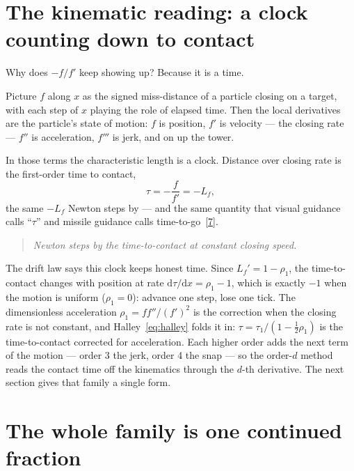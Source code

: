 \documentclass[11pt]{article}
\newcommand{\dd}{\mathrm{d}}
\newcommand{\Lf}{L_{f}}                 %
\newcommand{\rr}{\rho}                  %
\newcommand{\order}{d}                  %
\begin{document}
\section{The kinematic reading: a clock counting down to contact}

Why does $-f/f'$ keep showing up? Because it is a time.

Picture $f$ along $x$ as the signed miss-distance of a particle closing on a target,
with each step of $x$ playing the role of elapsed time. Then the local derivatives
are the particle's state of motion: $f$ is position, $f'$ is velocity --- the closing
rate --- $f''$ is acceleration, $f'''$ is jerk, and on up the tower.

In those terms the characteristic length is a clock. Distance over closing rate is
the first-order time to contact,
\begin{equation}
  \tau = -\frac{f}{f'} = -\Lf,
  \label{eq:ttc}
\end{equation}
the same $-\Lf$ Newton steps by --- and the same quantity that visual guidance calls
``$\tau$'' and missile guidance calls time-to-go~[\hyperlink{ref:7}{7}].

\begin{quote}\itshape
Newton steps by the time-to-contact at constant closing speed.
\end{quote}

The drift law says this clock keeps honest time. Since $\Lf'=1-\rr_1$, the
time-to-contact changes with position at rate $\dd\tau/\dd x=\rr_1-1$, which is
exactly $-1$ when the motion is uniform ($\rr_1=0$): advance one step, lose one tick.
The dimensionless acceleration $\rr_1=f f''/(f')^2$ is the correction when the closing
rate is not constant, and Halley~\eqref{eq:halley} folds it in:
$\tau=\tau_1/(1-\tfrac12\rr_1)$ is the time-to-contact corrected for acceleration.
Each higher order adds the next term of the motion --- order 3 the jerk, order 4 the
snap --- so the order-$\order$ method reads the contact time off the kinematics
through the $\order$-th derivative. The next section gives that family a single form.

\section{The whole family is one continued fraction}
\end{document}

